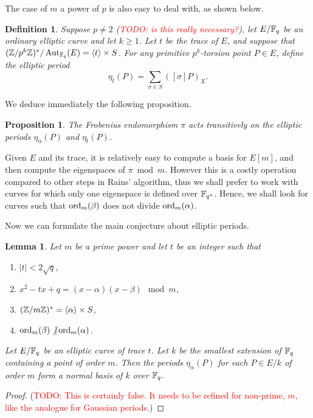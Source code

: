 \documentclass{article}
\newcommand{\todo}[1]{(\textcolor{red}{TODO: #1})}
\newtheorem{Def}{Definition}
\newtheorem{Prop}{Proposition}
\newtheorem{Lemma}{Lemma}
\begin{document}
The case of $m$ a power of $p$ is also easy to deal with, as shown
below.

\begin{Def}
  Suppose $p\ne2$ \todo{is this really necessary?}, let $E/\mathbb{F}_q$ be an
  ordinary elliptic curve and let $k\ge1$. Let $t$ be the trace of
  $E$, and suppose that $(\mathbb{Z}/p^k\mathbb{Z})^\ast/\operatorname{Aut}_{\mathbb{F}_q}(E)=\langle
  t\rangle\times S$. For any primitive $p^k$-torsion point $P\in E$,
  define the elliptic period
  \begin{equation}
    \eta_t(P) = \sum_{\sigma\in S} ([\sigma]P)_X.
  \end{equation}
\end{Def}

We deduce immediately the following proposition.

\begin{Prop}
  The Frobenius endomorphism $\pi$ acts transitively on the elliptic
  periods $\eta_\alpha(P)$ and $\eta_t(P)$.
\end{Prop}

Given $E$ and its trace, it is relatively easy to compute a basis for
$E[m]$, and then compute the eigenspaces of $\pi\bmod m$. However this
is a costly operation compared to other steps in Rains' algorithm,
thus we shall prefer to work with curves for which only one eigenspace
is defined over $\mathbb{F}_{q^n}$. Hence, we shall look for curves such
that $\operatorname{ord}_m(\beta)$ does not divide $\operatorname{ord}_m(\alpha)$.

Now we can formulate the main conjecture about elliptic periods.

\begin{Lemma}
  \label{th:elliptic-periods}
  Let $m$ be a prime power and let $t$ be an integer such that
  \begin{enumerate}
  \item $|t|<2\sqrt{q}$,
  \item $x^2-tx+q = (x-\alpha)(x-\beta) \mod m$,
  \item $(\mathbb{Z}/m\mathbb{Z})^\ast = \langle\alpha\rangle \times S$,
  \item $\operatorname{ord}_m(\beta) \not| \operatorname{ord}_m(\alpha)$.
  \end{enumerate}
  Let $E/\mathbb{F}_q$ be an elliptic curve of trace $t$. Let $k$ be the
  smallest extension of $\mathbb{F}_q$ containing a point of order $m$. Then
  the periods $\eta_\alpha(P)$ for each $P\in E/k$ of order $m$ form a
  normal basis of $k$ over $\mathbb{F}_q$.
\end{Lemma}
\begin{proof}
  \todo{This is certainly false. It needs to be refined for non-prime,
    $m$, like the analogue for Gaussian periods.}
\end{proof}
\end{document}

